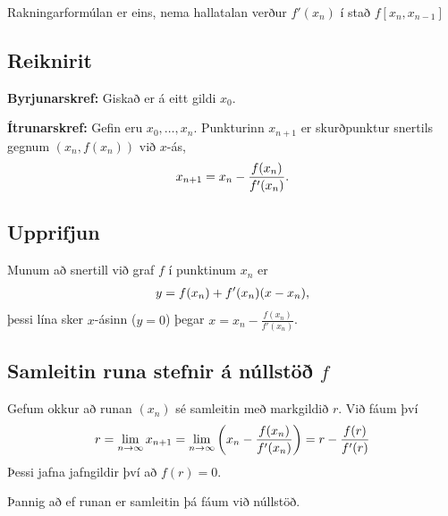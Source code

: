 \documentclass[letterpaper,10pt,icelandic]{sphinxmanual}
\begin{document}
Rakningarformúlan er eins, nema hallatalan verður \(f'(x_n)\) í stað
\(f[x_n,x_{n-1}]\)


\subsection{Reiknirit}
\label{kafli02:id4}
\textbf{Byrjunarskref:} Giskað er á eitt gildi \(x_0\).

\textbf{Ítrunarskref:} Gefin eru \(x_0,\dots,x_n\). Punkturinn \(x_{n+1}\) er
skurðpunktur snertils gegnum \((x_n,f(x_n))\) við \(x\)-ás,
\begin{gather}
\begin{split}x_{n+1}=x_n-\dfrac{f(x_n)}{f'(x_n)}.\end{split}\notag
\end{gather}

\subsection{Upprifjun}
\label{kafli02:upprifjun}
Munum að snertill við graf \(f\) í punktinum \(x_n\) er
\begin{gather}
\begin{split}y=f(x_n) + f'(x_n)(x-x_n),\end{split}\notag
\end{gather}
þessi lína sker \(x\)-ásinn (\(y=0\)) þegar
\(x=x_n - \frac{f(x_n)}{f'(x_n)}\).


\subsection{Samleitin runa stefnir á núllstöð \(f\)}
\label{kafli02:id5}
Gefum okkur að runan \((x_n)\) sé samleitin með markgildið
\(r\). Við fáum því
\begin{gather}
\begin{split}r=\lim_{n\to \infty}x_{n+1}=\lim_{n\to \infty}
\bigg(x_n-\dfrac{f(x_n)}{f'(x_n)}\bigg) =r-\dfrac{f(r)}{f'(r)}\end{split}\notag
\end{gather}
Þessi jafna jafngildir því að \(f(r)=0\).

Þannig að ef runan er samleitin þá fáum við núllstöð.
\end{document}
